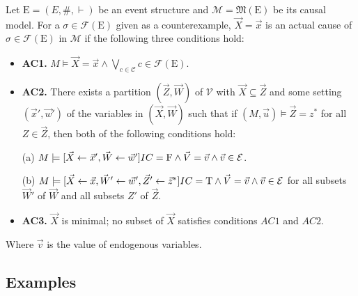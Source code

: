 \begin{definition}
    Let $\mathrm{E} = (E,\#,\vdash)$ be an event structure and
    $\mathcal{M} = \mathfrak{M}(\mathrm{E})$ be its causal model.
    For a $\sigma \in \mathcal{F}(\mathrm{E})$ given as a counterexample,
    $\vec X = \vec x$ is an actual cause of
    $\sigma \in \mathcal{F}(\mathrm{E})$ in $\mathcal{M}$ if the following three conditions hold:
    \begin{itemize}
        \item  \textbf{AC1.} $M\models \vec X = \vec x
                  \wedge \bigvee_{c \in \mathcal{C}}c \in \mathcal{F}(\mathrm{E})$.
        \item  \textbf{AC2. }There exists a partition $(\vec Z, \vec W)$ of $\mathcal{V}$ with $\vec X \subseteq \vec Z$ and some setting $(\vec x',\vec w')$ of the variables in $(\vec X,\vec W)$ such that if $(M,\vec u)\models \vec Z = z^*$ for all $Z\in \vec Z$, then both of the following conditions hold:

              (a) $M \models[\vec X \leftarrow \vec x', \vec W \leftarrow \vec w']
                    IC = \mathrm{F}
                  \wedge \vec V = \vec v
                  \wedge  \vec v \in \mathcal{E}$.

              (b) $M \models[\vec X\leftarrow \vec x, \vec W' \leftarrow \vec w', \vec Z'\leftarrow \vec z^*]
                IC = \mathrm{T}
                  \wedge \vec V = \vec v
                  \wedge \vec v \in \mathcal{E}$
              for all subsets $\vec W'$ of $\vec W$ and all subsets $Z'$ of $\vec Z$.

        \item  \textbf{AC3.} $\vec X$ is minimal; no subset of $\vec X$ satisfies conditions $AC1$ and $AC2$.
    \end{itemize}
    Where $\vec v$ is the value of endogenous variables.
\end{definition}
\pagebreak
\subsection{Examples}
